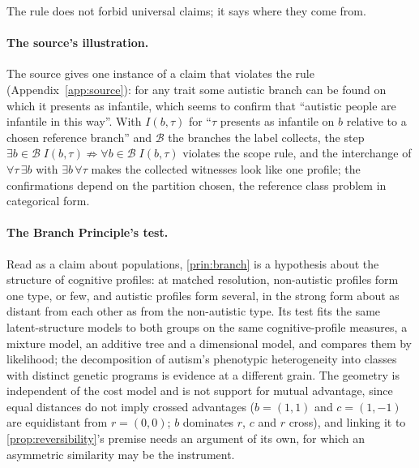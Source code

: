 \noindent The rule does not forbid universal claims; it says where they come from.

\paragraph{The source's illustration.} The source gives one instance of a claim that violates the rule (Appendix~\ref{app:source}): for any trait some autistic branch can be found on which it presents as infantile, which seems to confirm that ``autistic people are infantile in this way''. With $I(b, \tau)$ for ``$\tau$ presents as infantile on $b$ relative to a chosen reference branch'' and $\mathcal{B}$ the branches the label collects, the step $\exists b \in \mathcal{B}\; I(b, \tau) \not\Rightarrow \forall b \in \mathcal{B}\; I(b, \tau)$ violates the scope rule, and the interchange of $\forall \tau\, \exists b$ with $\exists b\, \forall \tau$ makes the collected witnesses look like one profile; the confirmations depend on the partition chosen, the reference class problem \cite{Hajek2007} in categorical form.

\paragraph{The Branch Principle's test.} Read as a claim about populations, \autoref{prin:branch} is a hypothesis about the structure of cognitive profiles: at matched resolution, non-autistic profiles form one type, or few, and autistic profiles form several, in the strong form about as distant from each other as from the non-autistic type. Its test fits the same latent-structure models to both groups on the same cognitive-profile measures, a mixture model, an additive tree \cite{SattathTversky1977} and a dimensional model, and compares them by likelihood; the decomposition of autism's phenotypic heterogeneity into classes with distinct genetic programs \cite{Litman2025} is evidence at a different grain. The geometry is independent of the cost model and is not support for mutual advantage, since equal distances do not imply crossed advantages ($b = (1, 1)$ and $c = (1, -1)$ are equidistant from $r = (0, 0)$; $b$ dominates $r$, $c$ and $r$ cross), and linking it to \autoref{prop:reversibility}'s premise needs an argument of its own, for which an asymmetric similarity \cite{Tversky1977} may be the instrument.

